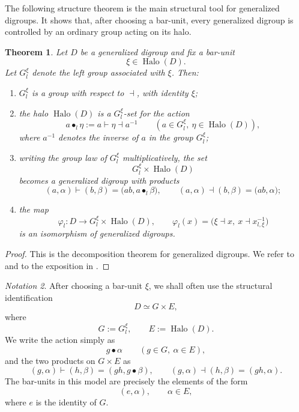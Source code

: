 \documentclass[11pt]{article}
\theoremstyle{plain}
\newtheorem{theorem}{Theorem}[section]
\theoremstyle{definition}
\theoremstyle{remark}
\newtheorem{notation}[theorem]{Notation}
\DeclareMathOperator{\Halo}{Halo}
\begin{document}
	The following structure theorem is the main structural tool for generalized
	digroups. It shows that, after choosing a bar-unit, every generalized digroup
	is controlled by an ordinary group acting on its halo.
	
	\begin{theorem}\label{thm:gdigroup-structure}
		Let \(D\) be a generalized digroup and fix a bar-unit
		\[
		\xi\in\Halo(D).
		\]
		Let \(G_l^\xi\) denote the left group associated with \(\xi\). Then:
		\begin{enumerate}
			\item \(G_l^\xi\) is a group with respect to \(\dashv\), with identity
			\(\xi\);
			
			\item the halo \(\Halo(D)\) is a \(G_l^\xi\)-set for the action
			\[
			a\bullet_l \eta
			:=
			a\vdash \eta\dashv a^{-1}
			\qquad
			(a\in G_l^\xi,\ \eta\in\Halo(D)),
			\]
			where \(a^{-1}\) denotes the inverse of \(a\) in the group
			\(G_l^\xi\);
			
			\item writing the group law of \(G_l^\xi\) multiplicatively, the set
			\[
			G_l^\xi\times \Halo(D)
			\]
			becomes a generalized digroup with products
			\[
			(a,\alpha)\vdash(b,\beta)
			=
			\bigl(ab,a\bullet_l\beta\bigr),
			\qquad
			(a,\alpha)\dashv(b,\beta)
			=
			\bigl(ab,\alpha\bigr);
			\]
			
			\item the map
			\[
			\varphi_l:D\longrightarrow G_l^\xi\times\Halo(D),
			\qquad
			\varphi_l(x)
			=
			\bigl(\xi\dashv x,\ x\dashv x^{-1}_{l,\xi}\bigr)
			\]
			is an isomorphism of generalized digroups.
		\end{enumerate}
	\end{theorem}
	
	\begin{proof}
		This is the decomposition theorem for generalized digroups. We refer to
		\cite[Theorem~5]{SVW} and to the exposition in \cite[Theorem~2]{RSV4}.
	\end{proof}
	
	\begin{notation}\label{not:g-cross-e}
		After choosing a bar-unit \(\xi\), we shall often use the structural
		identification
		\[
		D\simeq G\times E,
		\]
		where
		\[
		G:=G_l^\xi,
		\qquad
		E:=\Halo(D).
		\]
		We write the action simply as
		\[
		g\bullet\alpha
		\qquad
		(g\in G,\ \alpha\in E),
		\]
		and the two products on \(G\times E\) as
		\[
		(g,\alpha)\vdash(h,\beta)
		=
		(gh,g\bullet\beta),
		\qquad
		(g,\alpha)\dashv(h,\beta)
		=
		(gh,\alpha).
		\]
		The bar-units in this model are precisely the elements of the form
		\[
		(e,\alpha),
		\qquad
		\alpha\in E,
		\]
		where \(e\) is the identity of \(G\).
	\end{notation}
	
\end{document}
